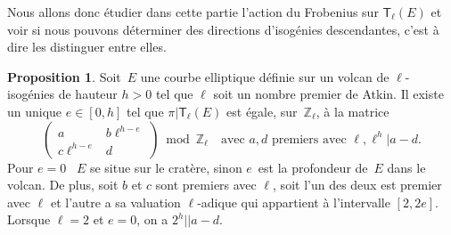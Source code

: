 \documentclass[10pt,a4paper]{book}
\theoremstyle{plain}
\theoremstyle{definition}
\theoremstyle{definition}
\theoremstyle{definition}
\theoremstyle{definition}
\newtheorem{prop}[thm]{Proposition}
\theoremstyle{definition}
\theoremstyle{remark}
\theoremstyle{remark}
\theoremstyle{definition}
\begin{document}
Nous allons donc étudier dans cette partie l'action du Frobenius sur 
$\mathsf{T}_{\ell}(E)$ et voir si nous pouvons déterminer des directions 
d'isogénies descendantes, c'est à dire les distinguer entre elles.
\begin{prop}\label{pro:mat:fro:atk}
Soit~$E$ une courbe elliptique définie sur un volcan de $\ell$-isogénies de 
hauteur $h>0$ tel que $\ell$ soit un nombre premier de Atkin. Il existe un unique
$e \in [ 0, h]$ tel que $\pi|\mathsf{T}_{\ell}(E)$ est égale, sur~$\mathbb{Z}_{\ell}$, à
 la matrice 
\begin{equation*}
\left ( \begin{matrix}a & b\ell^{h-e} \\ c\ell^{h-e} & d
\end{matrix}\right ) \bmod \mathbb{Z}_{\ell} \quad \text{avec }a,d \text{ premiers avec }\ell, \ell^{h} |a-d.
\end{equation*}
Pour $e = 0$ ~$E$ se situe sur le cratère, sinon $e$~est la profondeur 
de~$E$ dans le volcan.
De plus, soit $b$ et $c$ sont premiers avec $\ell$, soit l'un des deux est premier avec 
$\ell$ et l'autre a sa valuation $\ell$-adique qui appartient à l'intervalle 
$[2,2e]$. Lorsque $\ell=2$ et $e=0$, on a $2^{h} || a-d$.
\end{prop}
\end{document}
